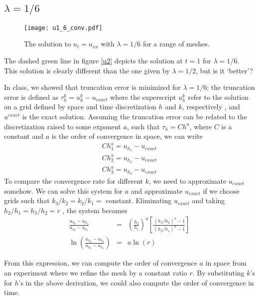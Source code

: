 \documentclass[11pt]{amsart}
\begin{document}
\subsection{$\lambda = 1/6$} 

\begin{figure}[t]
\begin{center} 
\texttt{[image: u1\_6\_conv.pdf]}
\caption{The solution to $u_t = u_{xx}$ with  $\lambda =1/6$ for a range of meshes.  }
\label{u16} 
\end{center}
\end{figure}

The dashed green line in figure \ref{u2} depicts the solution at $t=1$ for $\lambda =1/6$. This solution is clearly different than the one given by $\lambda =1/2$, but is it `better'? 

In class, we showed that truncation error is minimized for $\lambda = 1/6$;  the truncation error is defined as $\tau^k_h = u^{k}_h - u_{exact}$ where the superscript $u_h^k$ refer to the solution on a grid defined by space and  time discretization $h$ and $k$, respectively , and $u^{exact}$ is the exact solution. Assuming the truncation error can be related to the discretization raised to some exponent $a$, such that $\tau_h = Ch^a$, where $C$ is a constant and $a$ is the order of convergence in space, we can write  
\begin{eqnarray} 
Ch_1^a = u_{h_1} - u_{exact}\\
Ch_2^a= u_{h_2} - u_{exact}\\
Ch_3^a = u_{h_3} - u_{exact}
\end{eqnarray} 
To compare the convergence rate for different $k$, we need to approximate $u_{exact}$ somehow. We can solve this system for $a$ and approximate $u_{exact}$ if we choose grids such that $k_3/k_2 = k_2/k_1 =$ constant. Eliminating $u_{exact}$ and taking $h_2/h_1 = h_3/h_2 = r$ , the system becomes
\begin{eqnarray} 
\frac{u_{h_3}-u_{h_2}}{u_{h_2}-u_{h_1}} &=& \left(\frac{h_2}{h_1}\right)^a \left[\frac{(h_3/h_2)^a -1}{(h_2/h_1)^a-1}\right]\\
\ln\left( \frac{u_{h_3}-u_{h_2}}{u_{h_2}-u_{h_1}}\right) &=&  a \ln \left(r\right)
\end{eqnarray} 

From this expression, we can compute the order of convergence $a$ in space from an experiment where we refine the mesh by a constant ratio $r$. By substituting $k$'s for $h$'s in the above derivation, we could also compute the order of convergence in time.  
\end{document}
